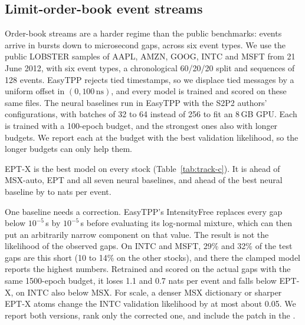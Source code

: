 \FloatBarrier
\subsection{Limit-order-book event streams}\label{sec:lob}
Order-book streams are a harder regime than the public benchmarks: events arrive in bursts down to
microsecond gaps, across six event types. We use the public LOBSTER \citep{huang2011lobster} samples of AAPL, AMZN, GOOG, INTC and MSFT
from 21 June 2012, with six event types, a chronological 60/20/20 split and sequences of 128
events. EasyTPP rejects tied timestamps, so we displace tied messages by a uniform offset in
$(0,100\,\text{ns})$, and every model is trained and scored on these same files. The neural
baselines run in EasyTPP with the S2P2 authors' configurations, with batches of 32 to 64 instead
of 256 to fit an 8\,GB GPU. Each is trained with a 100-epoch budget, and the strongest ones also
with longer budgets. We report each at the budget with the best validation likelihood, so the
longer budgets can only help them.

EPT-X is the best model on every stock (Table~\ref{tab:track-c}). It is ahead of MSX-auto, EPT and
all seven neural baselines, and ahead of the best neural baseline by \trackCmarginLo{} to
\trackCmarginHi{} nats per event.

One baseline needs a correction. EasyTPP's IntensityFree replaces every gap below $10^{-5}$\,s by
$10^{-5}$\,s before evaluating its log-normal mixture, which can then put an arbitrarily narrow
component on that value. The result is not the likelihood of the observed gaps. On INTC and MSFT,
29\% and 32\% of the test gaps are this short (10 to 14\% on the other stocks), and there the
clamped model reports the highest numbers. Retrained and scored on the actual gaps with the same
1500-epoch budget, it loses 1.1 and 0.7 nats per event and falls below EPT-X, on INTC also below
MSX. For scale, a denser MSX dictionary or sharper EPT-X atoms change the INTC validation
likelihood by at most about 0.05. We report both versions, rank only the corrected one, and include
the patch in the \codename.

\begin{table}[!htbp]\centering\small
\caption{LOBSTER order books: test log-likelihood per event (higher is better; mean $\pm$
s.d.\ over seeds where several were run). Bold: best; underlined: second best; shaded: our models.
$^\ast$As shipped, IntensityFree clamps gaps at $10^{-5}$\,s before scoring, so its score is not
the likelihood of the observed data; it is greyed and not ranked. The IntensityFree row is
retrained and scored on the actual gaps.}\label{tab:track-c}
\setlength{\tabcolsep}{5pt}

\end{table}

